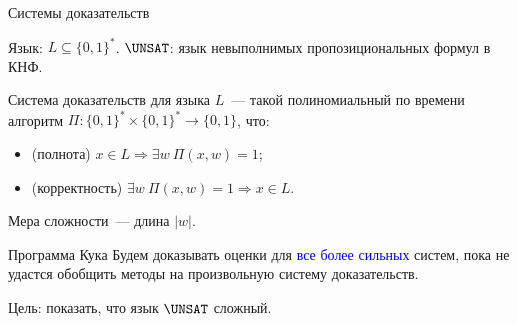 \begin{frame}{Системы доказательств}

	Язык: $L \subseteq \{0, 1\}^*$. $\UNSAT$: язык невыполнимых пропозициональных формул в КНФ.
    \pause

    \begin{definition}
        Система доказательств для языка $L$~--- такой полиномиальный по времени алгоритм $\Pi\colon \{0,
        1\}^* \times \{0, 1\}^* \rightarrow \{0, 1\}$, что:
        \begin{itemize}
            \item (полнота) $x \in L \Rightarrow \exists w ~ \Pi(x, w) = 1$;
            \item (корректность) $\exists w ~ \Pi(x, w) = 1 \Rightarrow x \in L$.
        \end{itemize}
    \end{definition}

    Мера сложности~--- длина $|w|$.

    \pause

    \begin{block}{Программа Кука}
        Будем доказывать оценки для \textcolor{blue}{все более сильных} систем, пока не удастся обобщить
        методы на произвольную систему доказательств.

        Цель: показать, что язык $\UNSAT$ сложный.
    \end{block}

\end{frame}


